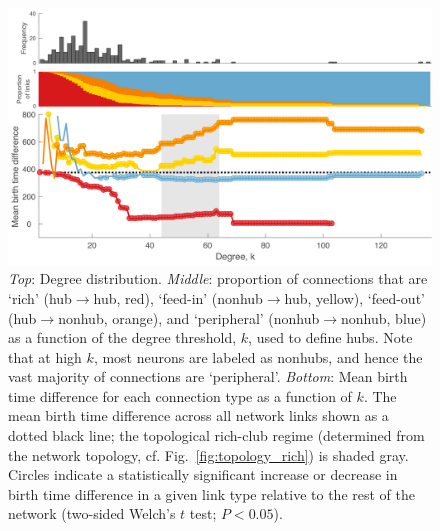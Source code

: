 \documentclass[10pt,letterpaper]{article}
\begin{document}
\begin{figure}[!h]
\label{BirthTimesk}
\centering
    \includegraphics[width=1\textwidth]{birthTimeRPFALL.pdf}
    \caption{
\emph{Top}: Degree distribution.
\emph{Middle}: proportion of connections that are `rich' (hub$\rightarrow$hub, red), `feed-in' (nonhub$\rightarrow$hub, yellow), `feed-out' (hub$\rightarrow$nonhub, orange), and `peripheral' (nonhub$\rightarrow$nonhub, blue) as a function of the degree threshold, $k$, used to define hubs.
Note that at high $k$, most neurons are labeled as nonhubs, and hence the vast majority of connections are `peripheral'.
\emph{Bottom}: Mean birth time difference for each connection type as a function of $k$.
The mean birth time difference across all network links shown as a dotted black line; the topological rich-club regime (determined from the network topology, cf. Fig.~\ref{fig:topology_rich}) is shaded gray.
Circles indicate a statistically significant increase or decrease in birth time difference in a given link type relative to the rest of the network (two-sided Welch's $t$ test; $P < 0.05$).
}
\end{figure}

\end{document}
